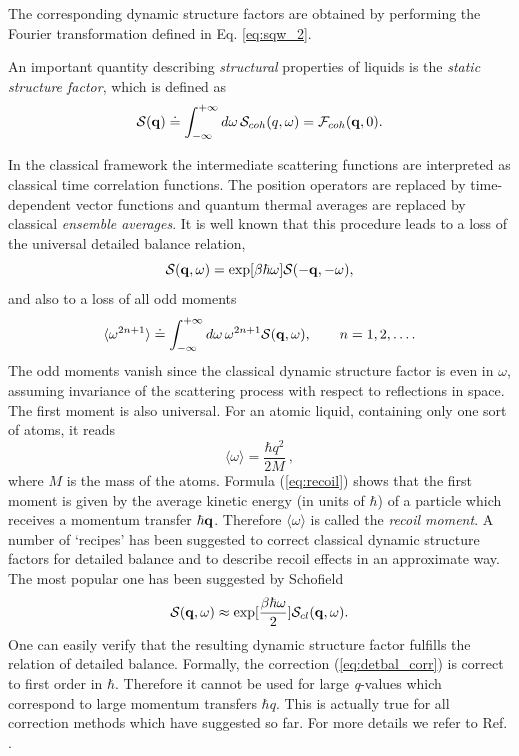 \documentclass[a4paper,11pt]{article}
\newcommand{\qval}{\textit{q}}
\begin{document}
The corresponding dynamic structure factors are obtained by performing the Fourier transformation defined in
Eq. \ref{eq:sqw_2}.

An important quantity describing {\em structural} properties of liquids is the {\em static structure factor}, which
is defined as
\begin{equation}
\label{eq:sq}
{\cal S}({\bf q}) \doteq \int_{-\infty}^{+\infty}d\omega\,
{\cal S}_{coh}(q,\omega) = {\cal F}_{coh}({\bf q},0).
\end{equation}

In the classical framework the intermediate scattering functions are interpreted as classical time correlation functions.
The position operators are replaced by time-dependent vector functions and quantum thermal averages are replaced by classical
{\em ensemble averages}. It is well known that this procedure leads to a loss of the universal detailed balance relation,
\begin{equation}
\label{eq:detbal}
{\cal S}({\bf q},\omega) = \exp[\beta\hbar\omega]
{\cal S}(-{\bf q},-\omega),
\end{equation}
and also to a loss of all odd moments
\begin{equation}
\label{eq:moments}
\langle\omega^{2n+1}\rangle \doteq
\int_{-\infty}^{+\infty}d\omega\,\omega^{2n+1} {\cal S}({\bf
q},\omega), \qquad n = 1,2,\ldots.
\end{equation}
The odd moments vanish since the classical dynamic structure factor is even in $\omega$, assuming invariance of the scattering
process with respect to reflections in space. The first moment is also universal. For an atomic liquid, containing only one
sort of atoms, it reads
\begin{equation}
\label{eq:recoil}
\langle\omega\rangle = \frac{\hbar q^2}{2M}\:,
\end{equation}
where $M$ is the mass of the atoms.  Formula (\ref{eq:recoil}) shows that the first moment is given by the average kinetic
energy (in units of $\hbar$) of a particle  which receives a momentum transfer
$\hbar {\bf q}$. Therefore $\langle\omega\rangle$ is called  the {\em recoil moment}. A number of `recipes' has been
suggested to correct classical dynamic structure factors for detailed balance and to describe recoil effects in an
approximate way. The most popular one has been suggested by Schofield \cite{Schofield}
\begin{equation}
\label{eq:detbal_corr}
{\cal S}({\bf q},\omega) \approx
\exp[\frac{\beta\hbar\omega}{2}]{\cal S}_{cl}({\bf q},\omega).
\end{equation}
One can easily verify that the resulting dynamic structure factor fulfills the relation of detailed balance. Formally, the
correction (\ref{eq:detbal_corr}) is correct to first order in $\hbar$. Therefore it cannot be used for large \qval-values which
correspond to large momentum transfers  $\hbar q$. This is actually true for all correction methods which have suggested so far.
For more details we refer to Ref. \cite{Kneller:1994}.
\end{document}
